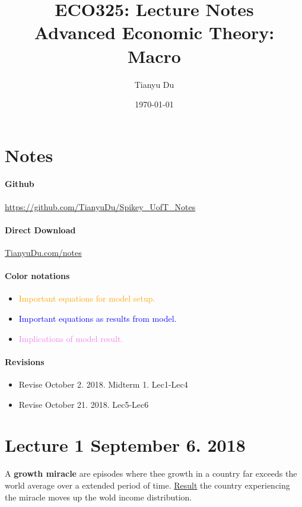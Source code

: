 \documentclass[]{article}
\title{ECO325: Lecture Notes \\ \small Advanced Economic Theory: Macro}
\author{Tianyu Du}
\date{\today}
\begin{document}
    \maketitle
    \doclicenseThis
    \section*{Notes}
    	\paragraph{Github} \url{https://github.com/TianyuDu/Spikey_UofT_Notes}
    	\paragraph{Direct Download} \url{TianyuDu.com/notes}
    	\paragraph{Color notations}
    		\begin{itemize}
    			\item \textcolor{orange}{Important equations for model setup.}
    			\item \textcolor{blue}{Important equations as results from model.}
    			\item \textcolor{violet}{Implications of model result.}
    		\end{itemize}
    \paragraph{Revisions}
    \begin{itemize}
    	\item Revise October 2. 2018. Midterm 1. Lec1-Lec4
    	\item Revise October 21. 2018. Lec5-Lec6
    \end{itemize}
    \tableofcontents
    \newpage
    
    \section{Lecture 1 September 6. 2018}
        \begin{definition}
            A \textbf{growth miracle} are episodes where thee growth in a country far exceeds the world average over a extended period of time. \ul{Result} the country experiencing the miracle moves up the wold income distribution.
        \end{definition}
        
\end{document}
